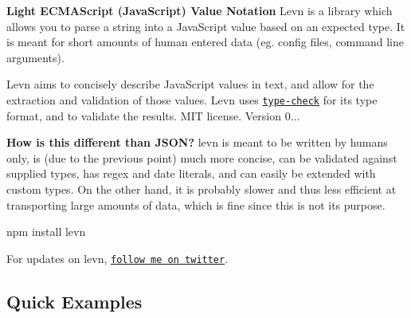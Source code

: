 {\bfseries Light E\+C\+M\+A\+Script (Java\+Script) Value Notation} Levn is a library which allows you to parse a string into a Java\+Script value based on an expected type. It is meant for short amounts of human entered data (eg. config files, command line arguments).

Levn aims to concisely describe Java\+Script values in text, and allow for the extraction and validation of those values. Levn uses \href{https://github.com/gkz/type-check}{\tt type-\/check} for its type format, and to validate the results. M\+IT license. Version 0...

{\bfseries How is this different than J\+S\+ON?} levn is meant to be written by humans only, is (due to the previous point) much more concise, can be validated against supplied types, has regex and date literals, and can easily be extended with custom types. On the other hand, it is probably slower and thus less efficient at transporting large amounts of data, which is fine since this is not its purpose. \begin{DoxyVerb}npm install levn
\end{DoxyVerb}


For updates on levn, \href{https://twitter.com/gkzahariev}{\tt follow me on twitter}.

\subsection*{Quick Examples}


